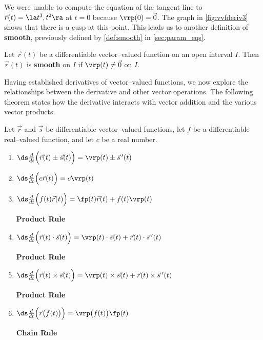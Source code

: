 We were unable to compute the equation of the tangent line to $\vec r(t)= \la t^3,t^2\ra$ at $t=0$ because $\vrp(0) = \vec 0$. The graph in \autoref{fig:vvfderiv3} shows that there is a cusp at this point. This leads us to another definition of \textbf{smooth}, previously defined by \autoref{def:smooth} in \autoref{sec:param_eqs}.

{Let $\vec r(t)$ be a differentiable vector--valued function on an open interval $I$. Then $\vec r(t)$ is \textbf{smooth} on $I$ if $\vrp(t)\neq \vec 0$ on $I$.
}

Having established derivatives of vector--valued functions, we now explore the relationships between the derivative and other vector operations. The following theorem states how the derivative interacts with vector addition and the various vector products.

{Let $\vec r$ and $\vec s$ be differentiable vector--valued functions, let $f$ be a differentiable real--valued function, and let $c$ be a real number.
\begin{enumerate}
	\item $\ds \frac{d}{dt}\Big(\vec r(t) \pm \vec s(t)\Big) = \vrp(t) \pm \vec s\,'(t)$
	\item $\ds \frac{d}{dt}\Big(c\vec r(t)\Big) = c\vrp(t)$
	\item \parbox{200pt}{$\ds \frac{d}{dt}\Big(f(t)\vec r(t)\Big) = \fp(t)\vec r(t) + f(t)\vrp(t)$} \textbf{Product Rule}
	\item \parbox{200pt}{$\ds \frac{d}{dt}\Big(\vec r(t)\cdot \vec s(t) \Big) = \vrp(t)\cdot \vec s(t) + \vec r(t)\cdot \vec s\,'(t)$} \textbf{Product Rule}
	\item \parbox{200pt}{$\ds \frac{d}{dt}\Big(\vec r(t)\times \vec s(t) \Big) = \vrp(t)\times \vec s(t) + \vec r(t)\times \vec s\,'(t)$} \textbf{Product Rule}
	\item \parbox{200pt}{$\ds \frac{d}{dt}\Big(\vec r\big(f(t)\big)\Big) = \vrp\big(f(t)\big)\fp(t)$}  \textbf{Chain Rule}
	\end{enumerate}}

